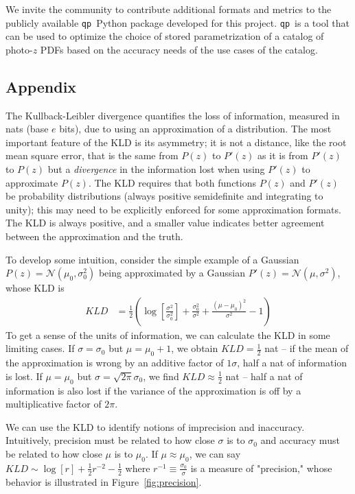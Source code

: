 \documentclass[\docopts]{\docclass}
\newcommand{\qp}{\texttt{qp}}
\newcommand{\pz}{photo-$z$ PDF}
\begin{document}
We invite the community to contribute additional formats and metrics to the 
publicly available \qp\ Python package developed for this project.  \qp\ is a 
tool that can be used to optimize the choice of stored parametrization of a 
catalog of \pz s based on the accuracy needs of the use cases of the catalog.


\subsection*{Appendix}
\label{sec:kld}

The Kullback-Leibler divergence quantifies the loss of information, measured in 
nats (base $e$ bits), due to using an approximation of a distribution.
The most important feature of the KLD is its asymmetry; it is not a distance, 
like the root mean square error, that is the same from $P(z)$ to $P'(z)$ as it 
is from $P'(z)$ to $P(z)$ but a \textit{divergence} in the information lost 
when using $P'(z)$ to approximate $P(z)$.
The KLD requires that both functions $P(z)$ and $P'(z)$ be probability 
distributions (always positive semidefinite and integrating to unity); this may 
need to be explicitly enforced for some approximation formats.
The KLD is always positive, and a smaller value indicates better agreement 
between the approximation and the truth.

To develop some intuition, consider the simple example of a Gaussian 
$P(z)=\mathcal{N}(\mu_{0}, \sigma_{0}^{2})$ being approximated by a Gaussian 
$P'(z)=\mathcal{N}(\mu, \sigma^{2})$, whose KLD is
\begin{align}
  \label{eq:gaussian}
  KLD &= \frac{1}{2}\left(\log\left[\frac{\sigma^{2}}{\sigma_{0}^{2}}\right] + 
\frac{\sigma_{0}^{2}}{\sigma^{2}} + \frac{(\mu-\mu_{0})^{2}}{\sigma^{2}} - 
1\right)
\end{align}
To get a sense of the units of information, we can calculate the KLD in some 
limiting cases.
If $\sigma=\sigma_{0}$ but $\mu=\mu_{0}+1$, we obtain $KLD=\frac{1}{2}$ nat -- 
if the mean of the approximation is wrong by an additive factor of $1\sigma$, 
half a nat of information is lost.
If $\mu=\mu_{0}$ but $\sigma=\sqrt{2\pi}\sigma_{0}$, we find 
$KLD\approx\frac{1}{2}$ nat -- half a nat of information is also lost if the 
variance of the approximation is off by a multiplicative factor of $2\pi$.

We can use the KLD to identify notions of imprecision and inaccuracy.
Intuitively, precision must be related to how close $\sigma$ is to $\sigma_{0}$ 
and accuracy must be related to how close $\mu$ is to $\mu_{0}$.
If $\mu\approx\mu_{0}$, we can say $KLD\sim\log[r] + \frac{1}{2}r^{-2} - 
\frac{1}{2}$ where $r^{-1}\equiv\frac{\sigma_{0}}{\sigma}$ is a measure of 
"precision," whose behavior is illustrated in Figure~\ref{fig:precision}.
\end{document}

